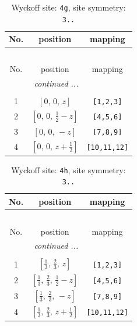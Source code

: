 \documentclass[fleqn,8pt]{jsarticle}
\begin{document}
\begin{longtable}{ccc}
\caption{Wyckoff site: {\tt 4g}, site symmetry: {\tt 3..}}
 \\
 \hline \hline
No. & position & mapping \\ \hline \endfirsthead

\multicolumn{2}{l}{\tablename\ \thetable{}} \\
 \hline \hline
No. & position & mapping \\ \hline \endhead

 \hline \hline
\multicolumn{2}{r}{\footnotesize\it continued ...} \\ \endfoot

 \hline \hline
\multicolumn{2}{r}{} \\ \endlastfoot

1 & $\left[ 0,\, 0,\, z \right]$ & {\tt [1,2,3]} \\ \hline
2 & $\left[ 0,\, 0,\, \frac{1}{2} - z \right]$ & {\tt [4,5,6]} \\ \hline
3 & $\left[ 0,\, 0,\, - z \right]$ & {\tt [7,8,9]} \\ \hline
4 & $\left[ 0,\, 0,\, z + \frac{1}{2} \right]$ & {\tt [10,11,12]} \\
\end{longtable}
\renewcommand{\arraystretch}{1.2}
\begin{longtable}{ccc}
\caption{Wyckoff site: {\tt 4h}, site symmetry: {\tt 3..}}
 \\
 \hline \hline
No. & position & mapping \\ \hline \endfirsthead

\multicolumn{2}{l}{\tablename\ \thetable{}} \\
 \hline \hline
No. & position & mapping \\ \hline \endhead

 \hline \hline
\multicolumn{2}{r}{\footnotesize\it continued ...} \\ \endfoot

 \hline \hline
\multicolumn{2}{r}{} \\ \endlastfoot

1 & $\left[ \frac{1}{3},\, \frac{2}{3},\, z \right]$ & {\tt [1,2,3]} \\ \hline
2 & $\left[ \frac{1}{3},\, \frac{2}{3},\, \frac{1}{2} - z \right]$ & {\tt [4,5,6]} \\ \hline
3 & $\left[ \frac{1}{3},\, \frac{2}{3},\, - z \right]$ & {\tt [7,8,9]} \\ \hline
4 & $\left[ \frac{1}{3},\, \frac{2}{3},\, z + \frac{1}{2} \right]$ & {\tt [10,11,12]} \\
\end{longtable}
\end{document}
